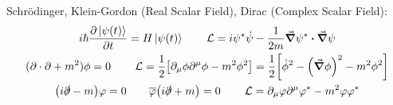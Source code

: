 Schrödinger, Klein-Gordon (Real Scalar Field), Dirac (Complex Scalar Field):
\begin{gather*}
    i\hbar\pdv{\ket{\psi(t)}}{t} = H\ket{\psi(t)}
    \qquad
    \Lc = i\psi^*\dot{\psi} - \frac{1}{2m}\grad{\psi^*}\vdot\grad{\psi}
    \\
    (\partial\cdot\partial + m^2)\phi = 0
    \qquad
    \Lc
    = \frac{1}{2}\qty[\partial_\mu\phi\partial^\mu\phi - m^2\phi^2]
    = \frac{1}{2}\qty[\dot{\phi}^2 - \qty(\grad{\phi})^2 - m^2\phi^2]
    \\
    \qty(i\slashed{\partial}-m)\varphi = 0
    \qquad
    \overline{\varphi}\qty(i\slashed{\partial}+m) = 0
    \qquad
    \Lc
    = \partial_\mu\varphi\partial^\mu\varphi^* - m^2\varphi\varphi^*
\end{gather*}
